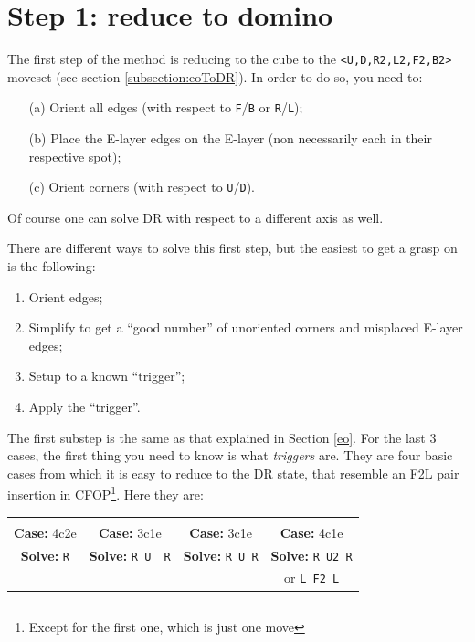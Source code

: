 \documentclass[11pt,a4paper]{book}
\newcommand{\p}{\textquotesingle}
\newcommand{\m}{\texttt}
\newcommand{\ps}{\p\,\,}
\begin{document}
\section{Step 1: reduce to domino}

The first step of the method is reducing to the cube to the \m{<U,D,R2,L2,F2,B2>} moveset (see section \ref{subsection:eoToDR}). In order to do so, you need to:
\begin{enumerate}
\item[(a)] Orient all edges (with respect to \m{F}/\m{B} or \m{R}/\m{L});
\item[(b)] Place the E-layer edges on the E-layer (non necessarily each in their respective spot);
\item[(c)] Orient corners (with respect to \m{U}/\m{D}).
\end{enumerate}

Of course one can solve DR with respect to a different axis as well.

There are different ways to solve this first step, but the easiest to get a grasp on is the following:
\begin{enumerate}
\item Orient edges;
\item Simplify to get a ``good number'' of unoriented corners and misplaced E-layer edges;
\item Setup to a known ``trigger'';
\item Apply the ``trigger''.
\end{enumerate}

The first substep is the same as that explained in Section \ref{eo}. For the last 3 cases, the first thing you need to know is what \emph{triggers} are. They are four basic cases from which it is easy to reduce to the DR state, that resemble an F2L pair insertion in CFOP\footnote{Except for the first one, which is just one move}. Here they are:

\begin{tabular}{cccc}
 & 
& & \\
\textbf{Case:} 4c2e & \textbf{Case:} 3c1e & \textbf{Case:} 3c1e & \textbf{Case:} 4c1e\\
\textbf{Solve:} \m{R} & \textbf{Solve:} \m{R U\ps R\p} & \textbf{Solve:} \m{R U R\p} & \textbf{Solve:} \m{R U2 R\p} \\ & & & or \m{L F2 L\p}
\end{tabular}
\end{document}
